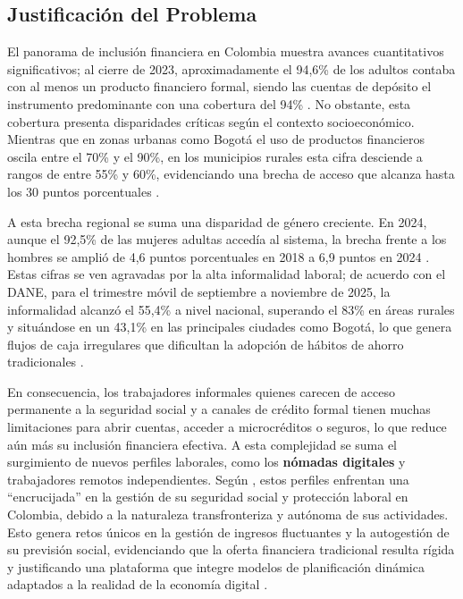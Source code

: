 \subsection*{Justificación del Problema}
El panorama de inclusión financiera en Colombia muestra avances cuantitativos significativos; al cierre de 2023, aproximadamente el 94,6\% de los adultos contaba con al menos un producto financiero formal, siendo las cuentas de depósito el instrumento predominante con una cobertura del 94\% \parencite{BancadeOportunidades01}. No obstante, esta cobertura presenta disparidades críticas según el contexto socioeconómico. Mientras que en zonas urbanas como Bogotá el uso de productos financieros oscila entre el 70\% y el 90\%, en los municipios rurales esta cifra desciende a rangos de entre 55\% y 60\%, evidenciando una brecha de acceso que alcanza hasta los 30 puntos porcentuales \parencite[pp.~18, 21-25]{BancadeOportunidades01}.

A esta brecha regional se suma una disparidad de género creciente. En 2024, aunque el 92,5\% de las mujeres adultas accedía al sistema, la brecha frente a los hombres se amplió de 4,6 puntos porcentuales en 2018 a 6,9 puntos en 2024 \parencite[p.~2]{Asobancaria01}. Estas cifras se ven agravadas por la alta informalidad laboral; de acuerdo con el DANE, para el trimestre móvil de septiembre a noviembre de 2025, la informalidad alcanzó el 55,4\% a nivel nacional, superando el 83\% en áreas rurales y situándose en un 43,1\% en las principales ciudades como Bogotá, lo que genera flujos de caja irregulares que dificultan la adopción de hábitos de ahorro tradicionales \parencite[p.~1]{DANE01}.

En consecuencia, los trabajadores informales quienes carecen de acceso permanente a la seguridad social y a canales de crédito formal tienen muchas limitaciones para abrir cuentas, acceder a microcréditos o seguros, lo que reduce aún más su inclusión financiera efectiva. A esta complejidad se suma el surgimiento de nuevos perfiles laborales, como los \textbf{nómadas digitales} y trabajadores remotos independientes. Según \textcite{Rodriguez2025}, estos perfiles enfrentan una ``encrucijada'' en la gestión de su seguridad social y protección laboral en Colombia, debido a la naturaleza transfronteriza y autónoma de sus actividades. Esto genera retos únicos en la gestión de ingresos fluctuantes y la autogestión de su previsión social, evidenciando que la oferta financiera tradicional resulta rígida y justificando una plataforma que integre modelos de planificación dinámica adaptados a la realidad de la economía digital \parencite{RevistaCIES01, DANE_Juventud2025, Rodriguez2025}.

